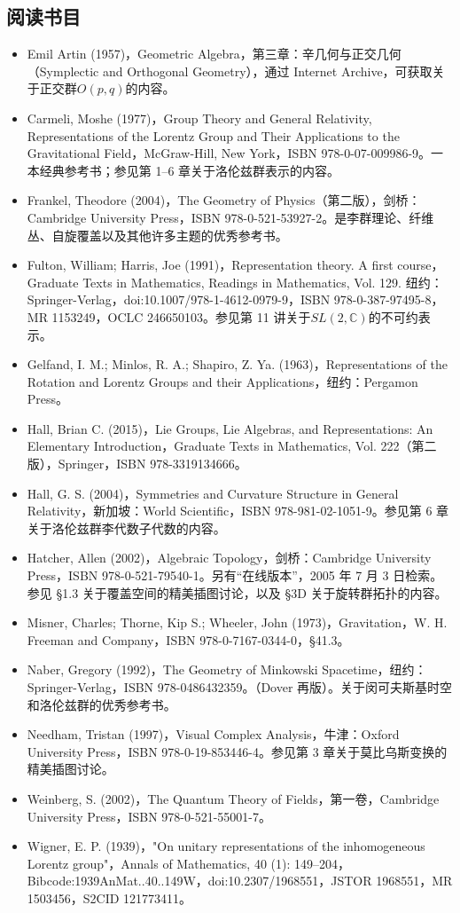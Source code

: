 \subsection{阅读书目}
\begin{itemize}
\item Emil Artin (1957)，Geometric Algebra，第三章：辛几何与正交几何（Symplectic and Orthogonal Geometry），通过 Internet Archive，可获取关于正交群$O(p, q)$的内容。
\item Carmeli, Moshe (1977)，Group Theory and General Relativity, Representations of the Lorentz Group and Their Applications to the Gravitational Field，McGraw-Hill, New York，ISBN 978-0-07-009986-9。一本经典参考书；参见第 1–6 章关于洛伦兹群表示的内容。
\item Frankel, Theodore (2004)，The Geometry of Physics（第二版），剑桥：Cambridge University Press，ISBN 978-0-521-53927-2。是李群理论、纤维丛、自旋覆盖以及其他许多主题的优秀参考书。
\item Fulton, William; Harris, Joe (1991)，Representation theory. A first course，Graduate Texts in Mathematics, Readings in Mathematics, Vol. 129. 纽约：Springer-Verlag，doi:10.1007/978-1-4612-0979-9，ISBN 978-0-387-97495-8，MR 1153249，OCLC 246650103。参见第 11 讲关于$SL(2,\mathbb{C})$的不可约表示。
\item Gelfand, I. M.; Minlos, R. A.; Shapiro, Z. Ya. (1963)，Representations of the Rotation and Lorentz Groups and their Applications，纽约：Pergamon Press。
\item Hall, Brian C. (2015)，Lie Groups, Lie Algebras, and Representations: An Elementary Introduction，Graduate Texts in Mathematics, Vol. 222（第二版），Springer，ISBN 978-3319134666。
\item Hall, G. S. (2004)，Symmetries and Curvature Structure in General Relativity，新加坡：World Scientific，ISBN 978-981-02-1051-9。参见第 6 章关于洛伦兹群李代数子代数的内容。
\item Hatcher, Allen (2002)，Algebraic Topology，剑桥：Cambridge University Press，ISBN 978-0-521-79540-1。另有“在线版本”，2005 年 7 月 3 日检索。参见 §1.3 关于覆盖空间的精美插图讨论，以及 §3D 关于旋转群拓扑的内容。
\item Misner, Charles; Thorne, Kip S.; Wheeler, John (1973)，Gravitation，W. H. Freeman and Company，ISBN 978-0-7167-0344-0，§41.3。
\item Naber, Gregory (1992)，The Geometry of Minkowski Spacetime，纽约：Springer-Verlag，ISBN 978-0486432359。（Dover 再版）。关于闵可夫斯基时空和洛伦兹群的优秀参考书。
\item Needham, Tristan (1997)，Visual Complex Analysis，牛津：Oxford University Press，ISBN 978-0-19-853446-4。参见第 3 章关于莫比乌斯变换的精美插图讨论。

\item Weinberg, S. (2002)，The Quantum Theory of Fields，第一卷，Cambridge University Press，ISBN 978-0-521-55001-7。
\item Wigner, E. P. (1939)，"On unitary representations of the inhomogeneous Lorentz group"，Annals of Mathematics, 40 (1): 149–204，Bibcode:1939AnMat..40..149W，doi:10.2307/1968551，JSTOR 1968551，MR 1503456，S2CID 121773411。
\end{itemize}
